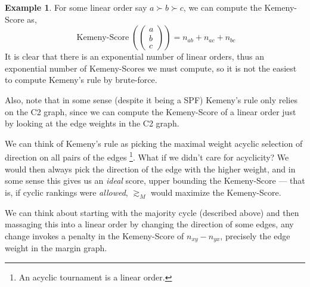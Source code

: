 \documentclass{book}
\theoremstyle{plain}
\theoremstyle{definition}
\newtheorem{example}[theorem]{Example}
\theoremstyle{remark}
\begin{document}
\begin{example}
    For some linear order 
    say $a \succ b \succ c$,
    we can compute the Kemeny-Score as,
    \[
        \operatorname{Kemeny-Score}(
            \begin{pmatrix} a \\ b \\ c \end{pmatrix}
        ) = n_{ab} + n_{ac} + n_{bc}
    \]
    It is clear that there is an 
    exponential number of 
    linear orders,
    thus an exponential number of Kemeny-Scores we must compute,
    so it is not the easiest 
    to compute Kemeny's rule by brute-force.

    Also, note that in some sense (despite it being a SPF)
    Kemeny's rule only relies on 
    the C2 graph, since we can compute the Kemeny-Score of a
    linear order just by looking at the edge weights in the C2 graph.

    We can think of Kemeny's rule as picking the maximal weight 
    acyclic selection of direction on all pairs of the edges
    \footnote{An acyclic tournament is 
    a linear order.}.
    What if we didn't care for acyclicity? We would then always 
    pick the direction of the edge with the higher weight,
    and in some sense this gives us an 
    \emph{ideal} score, 
    upper bounding the Kemeny-Score --- 
    that is, if cyclic rankings were \emph{allowed}, 
    $\gtrsim_M$ would maximize the Kemeny-Score.

    We can think about starting with the 
    majority cycle (described above) and then massaging this into 
    a linear order by changing the direction of some edges,
    any change invokes a penalty in the Kemeny-Score
    of $n_{xy} - n_{yx}$, precisely the 
    edge weight in the margin graph.
    
\end{example}
\end{document}
